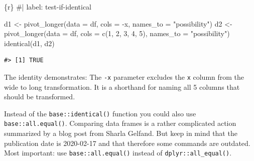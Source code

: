 \documentclass[
  letterpaper,
  DIV=11,
  numbers=noendperiod]{scrreprt}
\newenvironment{Shaded}{\begin{snugshade}}{\end{snugshade}}
\newcommand{\AttributeTok}[1]{\textcolor[rgb]{0.40,0.45,0.13}{#1}}
\newcommand{\CommentTok}[1]{\textcolor[rgb]{0.37,0.37,0.37}{#1}}
\newcommand{\FunctionTok}[1]{\textcolor[rgb]{0.28,0.35,0.67}{#1}}
\newcommand{\InformationTok}[1]{\textcolor[rgb]{0.37,0.37,0.37}{#1}}
\newcommand{\NormalTok}[1]{\textcolor[rgb]{0.00,0.23,0.31}{#1}}
\newcommand{\OtherTok}[1]{\textcolor[rgb]{0.00,0.23,0.31}{#1}}
\newcommand{\SpecialCharTok}[1]{\textcolor[rgb]{0.37,0.37,0.37}{#1}}
\newcommand{\StringTok}[1]{\textcolor[rgb]{0.13,0.47,0.30}{#1}}
\begin{document}
\begin{Shaded}
\begin{Highlighting}[]
\InformationTok{\textasciigrave{}\textasciigrave{}\textasciigrave{}\{r\}}
\CommentTok{\#| label: test{-}if{-}identical}

\NormalTok{d1 }\OtherTok{\textless{}{-}} \FunctionTok{pivot\_longer}\NormalTok{(}\AttributeTok{data =}\NormalTok{ df, }\AttributeTok{cols =} \SpecialCharTok{{-}}\NormalTok{x, }\AttributeTok{names\_to =} \StringTok{"possibility"}\NormalTok{)}
\NormalTok{d2 }\OtherTok{\textless{}{-}} \FunctionTok{pivot\_longer}\NormalTok{(}\AttributeTok{data =}\NormalTok{ df, }
                   \AttributeTok{cols =} \FunctionTok{c}\NormalTok{(}\StringTok{\textasciigrave{}}\AttributeTok{1}\StringTok{\textasciigrave{}}\NormalTok{, }\StringTok{\textasciigrave{}}\AttributeTok{2}\StringTok{\textasciigrave{}}\NormalTok{, }\StringTok{\textasciigrave{}}\AttributeTok{3}\StringTok{\textasciigrave{}}\NormalTok{, }\StringTok{\textasciigrave{}}\AttributeTok{4}\StringTok{\textasciigrave{}}\NormalTok{, }\StringTok{\textasciigrave{}}\AttributeTok{5}\StringTok{\textasciigrave{}}\NormalTok{), }
                   \AttributeTok{names\_to =} \StringTok{"possibility"}\NormalTok{)}
\FunctionTok{identical}\NormalTok{(d1, d2)}
\InformationTok{\textasciigrave{}\textasciigrave{}\textasciigrave{}}
\end{Highlighting}
\end{Shaded}

\begin{verbatim}
#> [1] TRUE
\end{verbatim}

The identity demonstrates: The \texttt{-x} parameter excludes the
\texttt{x} column from the wide to long transformation. It is a
shorthand for naming all 5 columns that should be transformed.

Instead of the \texttt{base::identical()} function you could also use
\texttt{base::all.equal()}. Comparing data frames is a rather
complicated action summarized by a blog post from Sharla Gelfand. But
keep in mind that the publication date is 2020-02-17 and that therefore
some commands are outdated. Most important: use
\texttt{base::all.equal()} instead of \texttt{dplyr::all\_equal()}.
\end{document}
